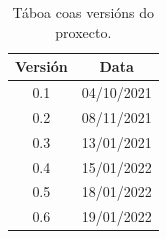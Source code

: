 \documentclass[11pt,a4paper,titlepage,twoside,openright,openbib]{report}
\begin{document}

 
 \setcounter{page}{1}

\begin{table}[h!]
\centering
\begin{tabular}{||c | c||} 
 \hline
 \textbf{Versión} & \textbf{Data}\\ [1ex] 
 \hline\hline
 0.1 & 04/10/2021\\
  [1ex] 
 \hline
 0.2 & 08/11/2021\\
  [1ex] 
 \hline
 0.3 & 13/01/2021\\
  [1ex] 
 \hline
  0.4 & 15/01/2022\\
  [1ex] 
 \hline
 0.5 & 18/01/2022\\
  [1ex] 
 \hline
 0.6 & 19/01/2022\\
  [1ex] 
 \hline
\end{tabular}
\caption{Táboa coas versións do proxecto.}
\label{table:1}
\end{table}

\let\cleardoublepage=\clearpage 

 \tableofcontents

\vspace{30pt}


 
 

 \setcounter{page}{1}
 
  
 
 
  \let\cleardoublepage=\clearpage 
 
  \let\cleardoublepage=\clearpage 



 

  \let\cleardoublepage=\clearpage
 
 
 
 

 
\end{document}
